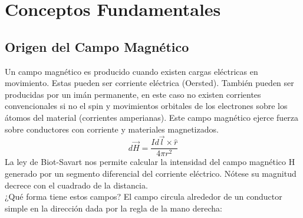 \section{Conceptos Fundamentales}
\subsection{Origen del Campo Magnético}
\label{sec:related:sec2}

Un campo magnético es producido cuando existen cargas eléctricas en movimiento. Estas pueden ser corriente eléctrica (Oersted). También pueden ser producidas por un imán permanente, en este caso no existen corrientes convencionales si no el spin y movimientos orbitales de los electrones sobre los átomos del material (corrientes amperianas). Este campo magnético ejerce fuerza sobre conductores con corriente y materiales magnetizados.\\
\begin{equation}
	 d \overrightarrow{H}=  \frac{Id \overrightarrow{l}\times\hat{r} }{4\pi r^{2}}
\end{equation}
La ley de Biot-Savart nos permite calcular la intensidad del campo magnético H generado por un segmento diferencial del corriente eléctrico. Nótese su magnitud decrece con el cuadrado de la distancia.\\
¿Qué forma tiene estos campos? El campo circula alrededor de un conductor simple en la dirección dada por la regla de la mano derecha:\\\\\\\\

